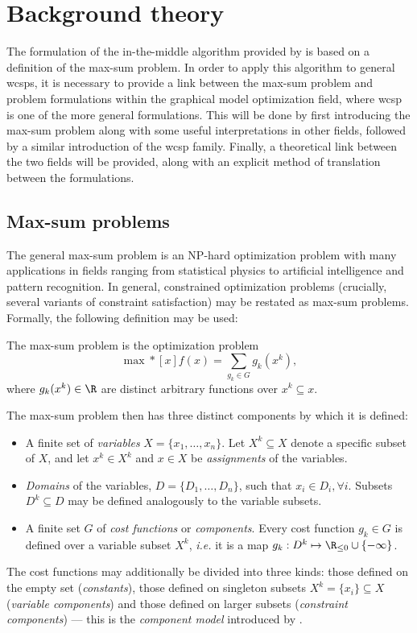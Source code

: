 \chapter{Background theory}
The formulation of the in-the-middle algorithm provided by \textcite{Wedelin08} is based on a definition of the max-sum problem.
In order to apply this algorithm to general \glspl{wcsp}, it is necessary to provide a link between the max-sum problem and problem formulations within the graphical model optimization field, where \gls{wcsp} is one of the more general formulations.
This will be done by first introducing the max-sum problem along with some useful interpretations in other fields, followed by a similar introduction of the \gls{wcsp} family.
Finally, a theoretical link between the two fields will be provided, along with an explicit method of translation between the formulations.

\section{Max-sum problems}
The general max-sum problem is an NP-hard optimization problem with many applications in fields ranging from statistical physics to artificial intelligence and pattern recognition.
In general, constrained optimization problems (crucially, several variants of constraint satisfaction) may be restated as max-sum problems.
Formally, the following definition \parencite[based on that of][\pno~11]{Wedelin13} may be used:
\begin{definition} \label{def:max-sum}
	The max-sum problem is the optimization problem
	\begin{equation*}
		\max*[x] f(x) = \sum_{g_k\in G} g_k(x^k),
	\end{equation*}
	where \(g_k(x^k) \in \R\) are distinct arbitrary functions over \(x^k \subseteq x\).
\end{definition}

The max-sum problem then has three distinct components by which it is defined:
\begin{itemize}
	\item A finite set of \emph{variables} \(X = \{x_1, \dotsc, x_n\}\). Let \(X^k \subseteq X\) denote a specific subset of \(X\), and let \(x^k \in X^k\) and \(x \in X\) be \emph{assignments} of the variables.
	\item \emph{Domains} of the variables, \(D = \{D_1, \dotsc, D_n\}\), such that \(x_i \in D_i, \forall i\). Subsets \(D^k \subseteq D\) may be defined analogously to the variable subsets.
	\item A finite set \(G\) of \emph{cost functions} or \emph{components}. Every cost function \(g_k \in G\) is defined over a variable subset \(X^k\), \emph{i.e.} it is a map \(g_k : D^k \mapsto \Rminus \cup \{-\infty\}\).
\end{itemize}
The cost functions may additionally be divided into three kinds: those defined on the empty set (\emph{constants}), those defined on singleton subsets \(X^k = \{x_i\} \subseteq X\) (\emph{variable components}) and those defined on larger subsets (\emph{constraint components}) --- this is the \emph{component model}\label{pg:component-model} introduced by \textcite[\pno~98]{Wedelin08}.

